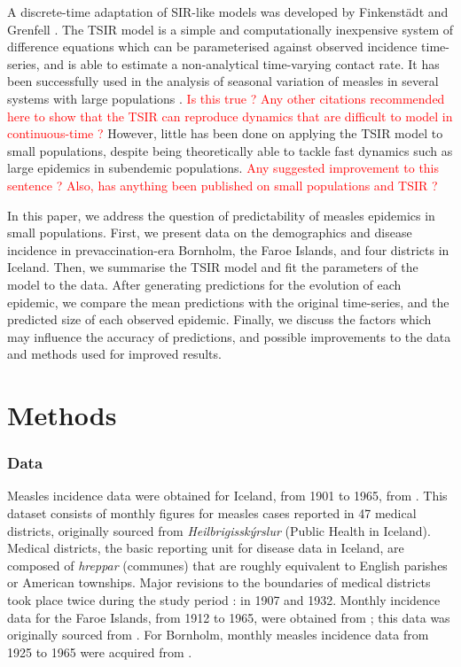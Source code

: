 \documentclass[10pt]{article}
\begin{document}
A discrete-time adaptation of SIR-like models was developed by Finkenst\"{a}dt and Grenfell \cite{Finkenstadt2000}. The TSIR model is a simple and computationally inexpensive system of difference equations which can be parameterised against observed incidence time-series, and is able to estimate a non-analytical time-varying contact rate. It has been successfully used in the analysis of seasonal variation of measles in several systems with large populations \cite{Bjornstad2002, Grenfell2002, Glass2003, Metcalf2010}. \textcolor{red}{Is this true ? Any other citations recommended here to show that the TSIR can reproduce dynamics that are difficult to model in continuous-time ?} However, little has been done on applying the TSIR model to small populations, despite being theoretically able to tackle fast dynamics such as large epidemics in subendemic populations. \textcolor{red}{Any suggested improvement to this sentence ? Also, has anything been published on small populations and TSIR ?}

In this paper, we address the question of predictability of measles epidemics in small populations. First, we present data on the demographics and disease incidence in prevaccination-era Bornholm, the Faroe Islands, and four districts in Iceland. Then, we summarise the TSIR model and fit the parameters of the model to the data. After generating predictions for the evolution of each epidemic, we compare the mean predictions with the original time-series, and the predicted size of each observed epidemic. Finally, we discuss the factors which may influence the accuracy of predictions, and possible improvements to the data and methods used for improved results.














\section*{Methods}

\subsubsection*{Data}

Measles incidence data were obtained for Iceland, from 1901 to 1965, from \cite{Cliff1981}. This dataset consists of monthly figures for measles cases reported in 47 medical districts, originally sourced from \textit{Heilbrig\dh{}issk\'{y}rslur} (Public Health in Iceland). Medical districts, the basic reporting unit for disease data in Iceland, are composed of \textit{hreppar} (communes) that are roughly equivalent to English parishes or American townships. Major revisions to the boundaries of medical districts took place twice during the study period : in 1907 and 1932. Monthly incidence data for the Faroe Islands, from 1912 to 1965, were obtained from \cite{Cliff2000}; this data was originally sourced from \cite{Lancaster1990}. For Bornholm, monthly measles incidence data from 1925 to 1965 were acquired from \cite{Kingdom}.
\end{document}
